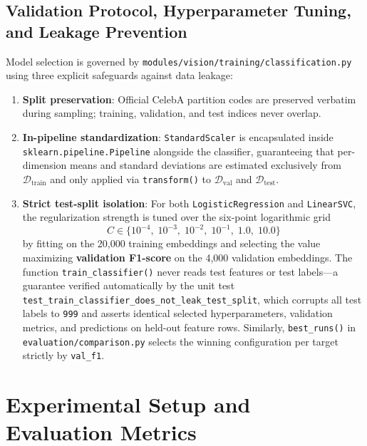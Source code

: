 \documentclass[12pt,a4paper]{article}
\newcommand{\code}[1]{\texttt{#1}}
\begin{document}
\subsection{Validation Protocol, Hyperparameter Tuning, and Leakage Prevention}
\label{subsec:leakage}

Model selection is governed by \code{modules/\allowbreak{}vision/\allowbreak{}training/\allowbreak{}classification.py} using three explicit safeguards against data leakage:
\begin{enumerate}[leftmargin=20pt, itemsep=2pt]
  \item \textbf{Split preservation}: Official CelebA partition codes are preserved verbatim during sampling; training, validation, and test indices never overlap.
  \item \textbf{In-pipeline standardization}: \code{StandardScaler} is encapsulated inside \code{sklearn.\allowbreak{}pipeline.\allowbreak{}Pipeline} alongside the classifier, guaranteeing that per-dimension means and standard deviations are estimated exclusively from $\mathcal{D}_{\text{train}}$ and only applied via \code{transform()} to $\mathcal{D}_{\text{val}}$ and $\mathcal{D}_{\text{test}}$.
  \item \textbf{Strict test-split isolation}: For both \code{LogisticRegression} and \code{LinearSVC}, the regularization strength is tuned over the six-point logarithmic grid
  \begin{equation*}
    C \in \{10^{-4},\; 10^{-3},\; 10^{-2},\; 10^{-1},\; 1.0,\; 10.0\}
  \end{equation*}
  by fitting on the 20,000 training embeddings and selecting the value maximizing \textbf{validation F1-score} on the 4,000 validation embeddings. The function \code{train\_\allowbreak{}classifier()} never reads test features or test labels---a guarantee verified automatically by the unit test \code{test\_\allowbreak{}train\_\allowbreak{}classifier\_\allowbreak{}does\_\allowbreak{}not\_\allowbreak{}leak\_\allowbreak{}test\_\allowbreak{}split}, which corrupts all test labels to \code{999} and asserts identical selected hyperparameters, validation metrics, and predictions on held-out feature rows. Similarly, \code{best\_\allowbreak{}runs()} in \code{evaluation/\allowbreak{}comparison.py} selects the winning configuration per target strictly by \code{val\_\allowbreak{}f1}.
\end{enumerate}

\section{Experimental Setup and Evaluation Metrics}
\label{sec:setup}
\end{document}
